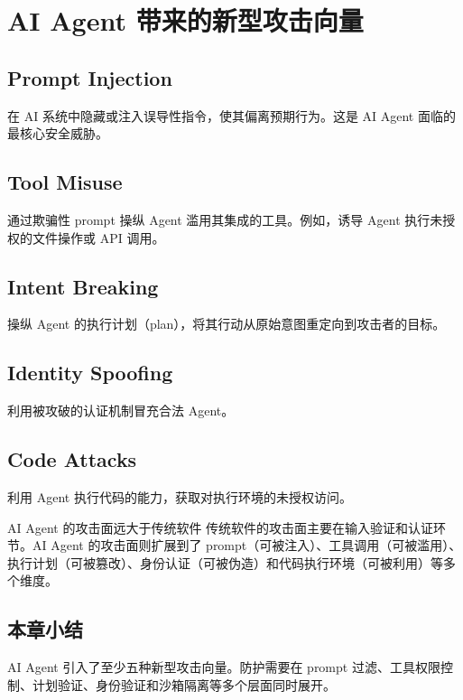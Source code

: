 \section{AI Agent 带来的新型攻击向量}

\subsection{Prompt Injection}

在 AI 系统中隐藏或注入误导性指令，使其偏离预期行为。这是 AI Agent 面临的最核心安全威胁。

\subsection{Tool Misuse}

通过欺骗性 prompt 操纵 Agent 滥用其集成的工具。例如，诱导 Agent 执行未授权的文件操作或 API 调用。

\subsection{Intent Breaking}

操纵 Agent 的执行计划（plan），将其行动从原始意图重定向到攻击者的目标。

\subsection{Identity Spoofing}

利用被攻破的认证机制冒充合法 Agent。

\subsection{Code Attacks}

利用 Agent 执行代码的能力，获取对执行环境的未授权访问。

\begin{warningbox}{AI Agent 的攻击面远大于传统软件}
传统软件的攻击面主要在输入验证和认证环节。AI Agent 的攻击面则扩展到了 prompt（可被注入）、工具调用（可被滥用）、执行计划（可被篡改）、身份认证（可被伪造）和代码执行环境（可被利用）等多个维度。
\end{warningbox}

\subsection{本章小结}

AI Agent 引入了至少五种新型攻击向量。防护需要在 prompt 过滤、工具权限控制、计划验证、身份验证和沙箱隔离等多个层面同时展开。


